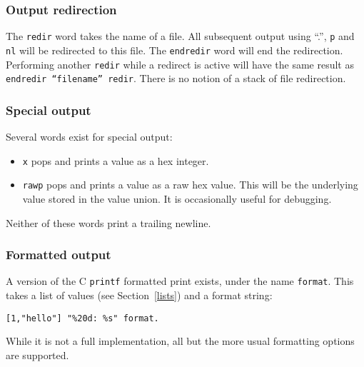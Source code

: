 \subsubsection{Output redirection}
The \texttt{redir} word takes the name of a file. All subsequent output
using ``.'', \texttt{p} and \texttt{nl} will be redirected to this file.
The \texttt{endredir} word will end the redirection. Performing another
\texttt{redir} while a redirect is active will have the same result
as \texttt{endredir ``filename'' redir}. There is no notion of a
stack of file redirection.  

\subsubsection{Special output}
Several words exist for special output:
\begin{itemize}
\item \texttt{x} pops and prints a value as a hex integer.
\item \texttt{rawp} pops and prints a value as a raw hex value. This will
be the underlying value stored in the value union. It is occasionally useful for debugging.
\end{itemize}
Neither of these words print a trailing newline.

\subsubsection{Formatted output}
A version of the C \texttt{printf} formatted print exists, under the
name \texttt{format}.
This takes a list of values (see Section~\ref{lists}) and a format string:
\begin{lstlisting}
[1,"hello"] "%20d: %s" format.
\end{lstlisting}
While it is not a full implementation, all but the more usual formatting
options are supported.


